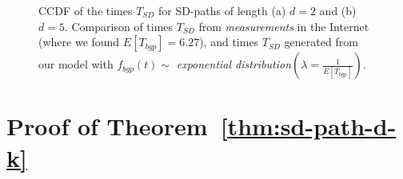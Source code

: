 



\begin{figure}
\centering
{}
\caption{CCDF of the times $T_{SD}$ for SD-paths of length (a) $d=2$ and (b) $d=5$. Comparison of times $T_{SD}$ from \textit{measurements} in the Internet (where we found $E[T_{bgp}] = 6.27$), and times $T_{SD}$ generated from our model with $f_{bgp}(t)\sim$ \textit{exponential distribution}$\left(\lambda=\frac{1}{E[T_{bgp}]}\right)$.}
\label{fig:measurements-poisson-assumption}
\end{figure}














\section{Proof of Theorem~\ref{thm:sd-path-d-k}}\label{sec:proof-of-thm-sd-path-d-k}


